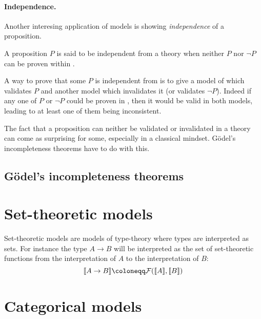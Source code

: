 \paragraph{Independence.}

Another interesing application of models is showing \emph{independence} of a
proposition.

\begin{definition}
  A proposition \(P\) is said to be independent from a theory \cT when neither
  \(P\) nor \(\neg P\) can be proven within \cT.
\end{definition}

A way to prove that some \(P\) is independent from \cT is to give a model of \cT
which validates \(P\) and another model which invalidates it (or validates
\(\neg P\)). Indeed if any one of \(P\) or \(\neg P\) %
could be proven in \cT, then it would be valid in both models, leading to
at least one of them being inconsistent.

The fact that a proposition can neither be validated or invalidated in a theory
can come as surprising for some, especially in a classical mindset.
Gödel's incompleteness theorems have to do with this.

\subsection{Gödel's incompleteness theorems}


\section{Set-theoretic models}

Set-theoretic models are models of type-theory where types are interpreted as
sets. For instance the type \(A \to B\) will be interpreted as the set of
set-theoretic functions from the interpretation of \(A\) to the interpretation
of \(B\):
\[
  \transl{A \to B} \coloneqq \mathcal{F}(\transl{A},\transl{B})
\]

\section{Categorical models}

